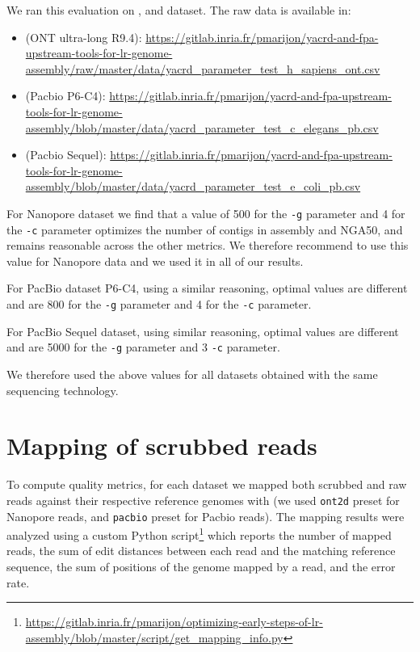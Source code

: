 \documentclass[./main.tex]{subfiles}
\begin{document}
We ran this evaluation on \hsapiens, \celegans and \ecolipb dataset. The raw data is available in:
\begin{itemize}
    \item \hsapiens (ONT ultra-long R9.4): \url{https://gitlab.inria.fr/pmarijon/yacrd-and-fpa-upstream-tools-for-lr-genome-assembly/raw/master/data/yacrd_parameter_test_h_sapiens_ont.csv}
    \item \celegans (Pacbio P6-C4): \url{https://gitlab.inria.fr/pmarijon/yacrd-and-fpa-upstream-tools-for-lr-genome-assembly/blob/master/data/yacrd_parameter_test_c_elegans_pb.csv}
    \item \ecoli (Pacbio Sequel): \url{https://gitlab.inria.fr/pmarijon/yacrd-and-fpa-upstream-tools-for-lr-genome-assembly/blob/master/data/yacrd_parameter_test_e_coli_pb.csv}
\end{itemize}

For \hsapiens Nanopore dataset we find that a value of 500 for the \texttt{-g} parameter and 4 for the \texttt{-c} parameter optimizes the number of contigs in \miniasm assembly and NGA50, and remains reasonable across the other metrics. We therefore recommend to use this value for Nanopore data and we used it in all of our results.

For \celegans PacBio dataset P6-C4, using a similar reasoning, optimal values are different and are 800 for the \texttt{-g} parameter and 4 for the \texttt{-c} parameter.

For \ecoli PacBio Sequel dataset, using similar reasoning, optimal values are different and are 5000 for the \texttt{-g} parameter and 3 \texttt{-c} parameter.

We therefore used the above values for all datasets obtained with the same sequencing technology.


\newpage
\section{Mapping of scrubbed reads}\label{appendix:result_scrubbed_reads}

To compute quality metrics, for each dataset we mapped both scrubbed and raw reads against their respective  reference genomes with \bwa (we used \texttt{ont2d} preset for Nanopore reads, and \texttt{pacbio} preset for Pacbio reads). The mapping results were analyzed using a custom Python script\footnote{\url{https://gitlab.inria.fr/pmarijon/optimizing-early-steps-of-lr-assembly/blob/master/script/get_mapping_info.py}} which reports the number of mapped reads, the sum of edit distances between each read and the matching reference sequence, the sum of positions of the genome mapped by a read, and the error rate.
\end{document}
